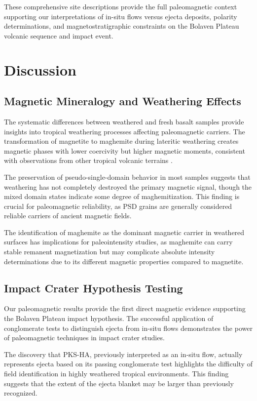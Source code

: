 \documentclass[twocolumn,11pt]{article}
\begin{document}
These comprehensive site descriptions provide the full paleomagnetic context supporting our interpretations of in-situ flows versus ejecta deposits, polarity determinations, and magnetostratigraphic constraints on the Bolaven Plateau volcanic sequence and impact event.

\section{Discussion}

\subsection{Magnetic Mineralogy and Weathering Effects}

The systematic differences between weathered and fresh basalt samples provide insights into tropical weathering processes affecting paleomagnetic carriers. The transformation of magnetite to maghemite during lateritic weathering creates magnetic phases with lower coercivity but higher magnetic moments, consistent with observations from other tropical volcanic terrains \citep{Ananthapadmanabha2014}.

The preservation of pseudo-single-domain behavior in most samples suggests that weathering has not completely destroyed the primary magnetic signal, though the mixed domain states indicate some degree of maghemitization. This finding is crucial for paleomagnetic reliability, as PSD grains are generally considered reliable carriers of ancient magnetic fields.

The identification of maghemite as the dominant magnetic carrier in weathered surfaces has implications for paleointensity studies, as maghemite can carry stable remanent magnetization but may complicate absolute intensity determinations due to its different magnetic properties compared to magnetite.

\subsection{Impact Crater Hypothesis Testing}

Our paleomagnetic results provide the first direct magnetic evidence supporting the Bolaven Plateau impact hypothesis. The successful application of conglomerate tests to distinguish ejecta from in-situ flows demonstrates the power of paleomagnetic techniques in impact crater studies.

The discovery that PKS-HA, previously interpreted as an in-situ flow, actually represents ejecta based on its passing conglomerate test highlights the difficulty of field identification in highly weathered tropical environments. This finding suggests that the extent of the ejecta blanket may be larger than previously recognized.
\end{document}

